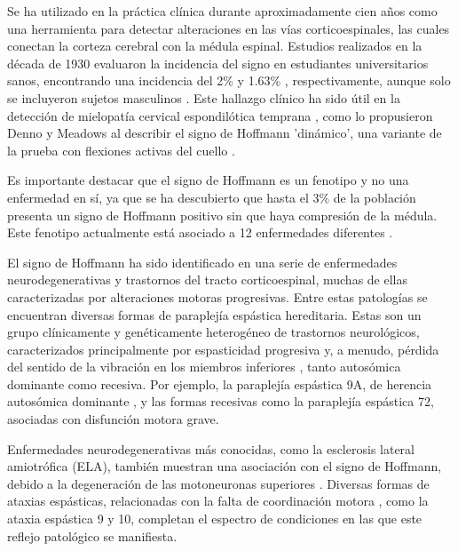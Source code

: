 Se ha utilizado en la práctica clínica durante aproximadamente cien años como una herramienta para detectar alteraciones en las vías corticoespinales, las cuales conectan la corteza cerebral con la médula espinal. Estudios realizados en la década de 1930 evaluaron la incidencia del signo en estudiantes universitarios sanos, encontrando una incidencia del 2\% y 1.63\% \cite{echols1936hoffmann} \cite{fay1933clinical}, respectivamente, aunque solo se incluyeron sujetos masculinos \cite{glaser2001cervical}. Este hallazgo clínico ha sido útil en la detección de mielopatía cervical espondilótica temprana \cite{denno1991early}, como lo propusieron Denno y Meadows al describir el signo de Hoffmann 'dinámico', una variante de la prueba con flexiones activas del cuello \cite{glaser2001cervical}.

Es importante destacar que el signo de Hoffmann es un fenotipo y no una enfermedad en sí, ya que se ha descubierto que hasta el 3\% de la población presenta un signo de Hoffmann positivo sin que haya compresión de la médula. Este fenotipo actualmente está asociado a 12 enfermedades diferentes \cite{whitney}.

El signo de Hoffmann ha sido identificado en una serie de enfermedades neurodegenerativas y trastornos del tracto corticoespinal, muchas de ellas caracterizadas por alteraciones motoras progresivas. Entre estas patologías se encuentran diversas formas de paraplejía espástica hereditaria. Estas son un grupo clínicamente y genéticamente heterogéneo de trastornos neurológicos, caracterizados principalmente por espasticidad progresiva y, a menudo, pérdida del sentido de la vibración en los miembros inferiores \cite{Esteves2014}, tanto autosómica dominante como recesiva. Por ejemplo, la paraplejía espástica 9A, de herencia autosómica dominante \cite{10.1093/brain/awv143}, y las formas recesivas como la paraplejía espástica 72, asociadas con disfunción motora grave.

Enfermedades neurodegenerativas más conocidas, como la esclerosis lateral amiotrófica (ELA), también muestran una asociación con el signo de Hoffmann, debido a la degeneración de las motoneuronas superiores \cite{RIANCHO201927}. Diversas formas de ataxias espásticas, relacionadas con la falta de coordinación motora \cite{Pedroso2022}, como la ataxia espástica 9 y 10, completan el espectro de condiciones en las que este reflejo patológico se manifiesta.

